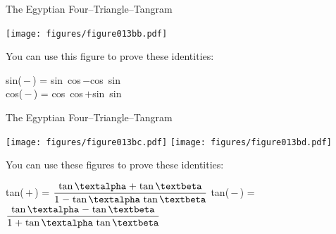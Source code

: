 \documentclass[14pt]{beamer}
\begin{document}

    \begin{frame}{The Egyptian Four--Triangle--Tangram}
        \begin{center}
            \texttt{[image: figures/figure013bb.pdf]}

            \bigskip
            You can use this figure to prove these identities:
            \bigskip

            {\small sin(\textalpha\,$-$\,\textbeta) = sin\,\textalpha\,\,cos\,\textbeta\;$-$\;cos\,\textalpha\,\,sin\,\textbeta\\[1ex]
            cos(\textalpha\,$-$\,\textbeta) = cos\,\textalpha\,\,cos\,\textbeta\;$+$\;sin\,\textalpha\,\,sin\,\textbeta\;}
        \end{center}
    \end{frame}


    \begin{frame}{The Egyptian Four--Triangle--Tangram}
        \begin{center}
            \texttt{[image: figures/figure013bc.pdf]}\qquad
            \texttt{[image: figures/figure013bd.pdf]}

            \bigskip
            You can use these figures to prove these identities:
            \bigskip

            {\footnotesize tan(\textalpha\,$+$\,\textbeta) = $\displaystyle\frac{\text{tan\,\textalpha\;$+$\;tan\,\textbeta}}{\text{1\;$-$\;tan\,\textalpha\,\,tan\,\textbeta}}$\qquad
            tan(\textalpha\,$-$\,\textbeta) = $\displaystyle\frac{\text{tan\,\textalpha\;$-$\;tan\,\textbeta}}{\text{1\;$+$\;tan\,\textalpha\,\,tan\,\textbeta}}$\\[5ex]}
        \end{center}
    \end{frame}

\end{document}
